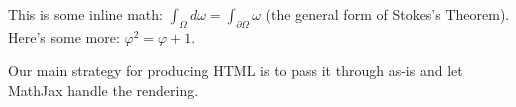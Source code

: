 This is some inline math: $\int_\Omega d\omega = \int_{\partial\Omega} \omega$ (the general form of Stokes's Theorem). Here's some more: \( \varphi^2 = \varphi + 1 \).

Our main strategy for producing HTML is to pass it through as-is and let MathJax handle the rendering.
